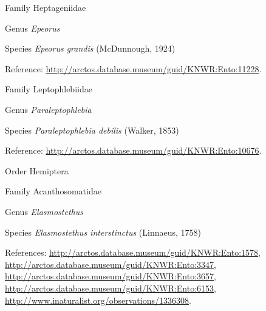 \documentclass[9pt, article]{memoir}
\begin{document}
\begin{multicols}{2}
\vspace{6pt}\noindent\hspace{24pt}Family Heptageniidae


\vspace{6pt}\noindent\hspace{30pt}Genus \textit{Epeorus}


\vspace{6pt}\noindent\hspace{36pt}Species \textit{Epeorus grandis} (McDunnough, 1924)


\vspace{6pt}Reference: 
\url{http://arctos.database.museum/guid/KNWR:Ento:11228}.

\vspace{6pt}\noindent\hspace{24pt}Family Leptophlebiidae


\vspace{6pt}\noindent\hspace{30pt}Genus \textit{Paraleptophlebia}


\vspace{6pt}\noindent\hspace{36pt}Species \textit{Paraleptophlebia debilis} (Walker, 1853)


\vspace{6pt}Reference: 
\url{http://arctos.database.museum/guid/KNWR:Ento:10676}.

\vspace{6pt}\noindent\hspace{18pt}Order Hemiptera


\vspace{6pt}\noindent\hspace{24pt}Family Acanthosomatidae


\vspace{6pt}\noindent\hspace{30pt}Genus \textit{Elasmostethus}


\vspace{6pt}\noindent\hspace{36pt}Species \textit{Elasmostethus interstinctus} (Linnaeus, 1758)


\vspace{6pt}References: 
\url{http://arctos.database.museum/guid/KNWR:Ento:1578}, 
\url{http://arctos.database.museum/guid/KNWR:Ento:3347}, 
\url{http://arctos.database.museum/guid/KNWR:Ento:3657}, 
\url{http://arctos.database.museum/guid/KNWR:Ento:6153}, 
\url{http://www.inaturalist.org/observations/1336308}.


\end{multicols}
\end{document}
